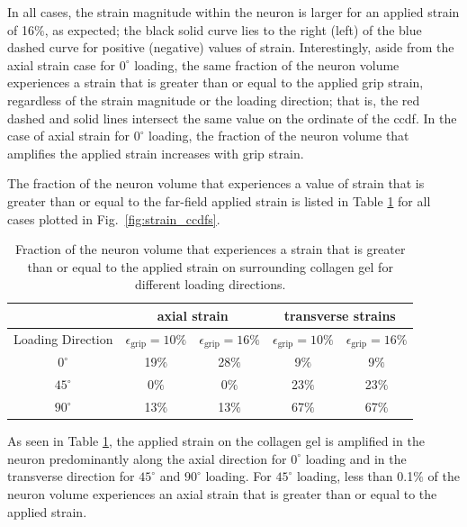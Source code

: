 \documentclass[]{interact}
\begin{document}
In all cases, the strain magnitude within the neuron is larger for an applied strain of 16$\%$, as expected; the black solid curve lies to the right (left) of the blue dashed curve for positive (negative) values of strain. Interestingly, aside from the axial strain case for $0^{\circ}$ loading, the same fraction of the neuron volume experiences a strain that is greater than or equal to the applied grip strain, regardless of the strain magnitude or the loading direction; that is, the red dashed and solid lines intersect the same value on the ordinate of the ccdf. In the case of axial strain for $0^{\circ}$ loading, the fraction of the neuron volume that amplifies the applied strain increases with grip strain. 

The fraction of the neuron volume that experiences a value of strain that is greater than or equal to the far-field applied strain is listed in Table \ref{table:ccdf_volfrac_compare} for all cases plotted in Fig.\ \ref{fig:strain_ccdfs}.
%
\begin{table}[ht]
\begin{center}
\begin{tabular}{ c c c c c }
\hline\hline
& \multicolumn{2}{c}{axial strain} & \multicolumn{2}{c}{transverse strains} \\ \hline 
Loading Direction & $\epsilon_{\text{grip}}=10\%$ & $\epsilon_{\text{grip}}=16\%$ & $\epsilon_{\text{grip}}=10\%$ & $\epsilon_{\text{grip}}=16\%$ \\
\hline 
$0^{\circ}$ & 19$\%$ & 28$\%$ & 9$\%$ & 9$\%$\\ 
$45^{\circ}$ & 0$\%$ & 0$\%$ & 23$\%$ & 23$\%$\\
$90^{\circ}$ & 13$\%$ & 13$\%$ & 67$\%$ & 67$\%$\\ \hline \hline
\end{tabular}
\end{center}
\caption{Fraction of the neuron volume that experiences a strain that is greater than or equal to the applied strain on surrounding collagen gel for different loading directions.}
\label{table:ccdf_volfrac_compare}
\end{table}
%
As seen in Table \ref{table:ccdf_volfrac_compare}, the applied strain on the collagen gel is amplified in the neuron predominantly along the axial direction for $0^{\circ}$ loading and in the transverse direction for $45^{\circ}$ and $90^{\circ}$ loading. For $45^{\circ}$ loading, less than 0.1$\%$ of the neuron volume experiences an axial strain that is greater than or equal to the applied strain.
\end{document}
